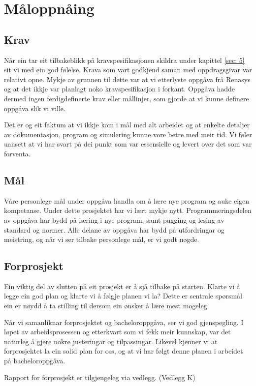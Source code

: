 \section{Måloppnåing}
\thispagestyle{fancy}

\subsection{Krav}
Når ein tar eit tilbakeblikk på kravspesifikasjonen skildra under kapittel \ref{sec: 5} sit vi med ein god følelse.
Krava som vart godkjend saman med oppdragsgivar var relativt opne.
Mykje av grunnen til dette var at vi etterlyste oppgåva frå \gls{Renasys} og at det ikkje var planlagt noko kravspesifikasjon i forkant. \newline
Oppgåva hadde dermed ingen ferdigdefinerte krav eller mållinjer, som gjorde at vi kunne definere oppgåva slik vi ville.

Det er og eit faktum at vi ikkje kom i mål med alt arbeidet og at enkelte detaljer av dokumentasjon, program og simulering
kunne vore betre med meir tid.
Vi føler uansett at vi har svart på dei punkt som var essensielle og levert over det som var forventa.



\subsection{Mål}
Våre personlege mål under oppgåva handla om å lære nye program og auke eigen kompetanse. Under dette prosjektet har vi lært mykje nytt. 
Programmeringsdelen av oppgåva har bydd på læring i nye program, samt pugging og lesing av standard og normer.
Alle delane av oppgåva har bydd på utfordringar og meistring, og når vi ser tilbake personlege mål, er vi godt nøgde.

\subsection{Forprosjekt}
Ein viktig del av slutten på eit prosjekt er å sjå tilbake på starten.
Klarte vi å legge ein god plan og klarte vi å følgje planen vi la?
Dette er sentrale spørsmål ein er nøydd å ta stilling til dersom ein ønsker å lære mest mogeleg.

Når vi samanliknar forprosjektet og bacheloroppgåva, ser vi god gjenspegling. 
I løpet av arbeidsprosessen og etterkvart som vi fekk meir kunnskap, var det naturleg å gjere nokre justeringar og tilpassingar. 
Likevel kjenner vi at forprosjektet la ein solid plan for oss, og at vi har følgt denne planen i arbeidet på bacheloroppgåva.

Rapport for forprosjekt er tilgjengeleg via vedlegg. (Vedlegg K)

\newpage